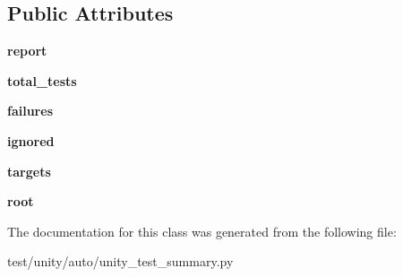 \subsection*{Public Attributes}
\begin{DoxyCompactItemize}
\item 
\mbox{\label{classunity__test__summary_1_1UnityTestSummary_a3e9af40b0081ce3e86ddc63e1fbfa043}} 
{\bfseries report}
\item 
\mbox{\label{classunity__test__summary_1_1UnityTestSummary_abd63a450624526e498bdc1499078f124}} 
{\bfseries total\+\_\+tests}
\item 
\mbox{\label{classunity__test__summary_1_1UnityTestSummary_a67dd44048def2d9bde0385dad9495666}} 
{\bfseries failures}
\item 
\mbox{\label{classunity__test__summary_1_1UnityTestSummary_a65e84f84c4ebb04f5da3affb20366fe9}} 
{\bfseries ignored}
\item 
\mbox{\label{classunity__test__summary_1_1UnityTestSummary_aad532f6e4d7b4af23abd0410aecbfb51}} 
{\bfseries targets}
\item 
\mbox{\label{classunity__test__summary_1_1UnityTestSummary_a8cda0aae4f52ce974faace17a99eff79}} 
{\bfseries root}
\end{DoxyCompactItemize}


The documentation for this class was generated from the following file\+:\begin{DoxyCompactItemize}
\item 
test/unity/auto/unity\+\_\+test\+\_\+summary.\+py\end{DoxyCompactItemize}
